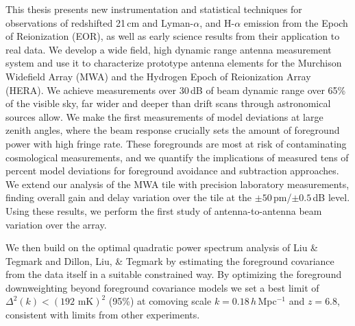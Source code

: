% 
% 
%

This thesis presents new instrumentation and statistical techniques for observations of redshifted 21\,cm and Lyman-$\alpha$, and H-$\alpha$  emission from the Epoch of Reionization (EOR), as well as early science results from their application to real data. We develop a wide field, high dynamic range antenna measurement system and use it to characterize prototype antenna elements for the Murchison Widefield Array (MWA) and the Hydrogen Epoch of Reionization Array (HERA). We achieve measurements over 30\,dB of beam dynamic range over 65\% of the visible sky, far wider and deeper than drift scans through astronomical sources allow. We make the first measurements of model deviations at large zenith angles, where the beam response crucially sets the amount of foreground power with high fringe rate. These foregrounds are most at risk of contaminating cosmological measurements, and we quantify the implications of measured tens of percent model deviations for foreground avoidance and subtraction approaches. We extend our analysis of the MWA tile with precision laboratory measurements, finding overall gain and delay variation over the tile at the $\pm50$\,pm/$\pm0.5$\,dB level. Using these results, we perform the first study of antenna-to-antenna beam variation over the array. 

We then build on the optimal quadratic power spectrum analysis of Liu \& Tegmark and Dillon, Liu, \& Tegmark by estimating the foreground covariance from the data itself in a suitable constrained way. By optimizing the foreground downweighting beyond foreground covariance models we set a best limit of $\Delta^2(k) < (192 \text{ mK})^2$ (95\%) at comoving scale $k = 0.18$\,$h$\,Mpc$^{-1}$ and $z = 6.8$, consistent with limits from other experiments.

